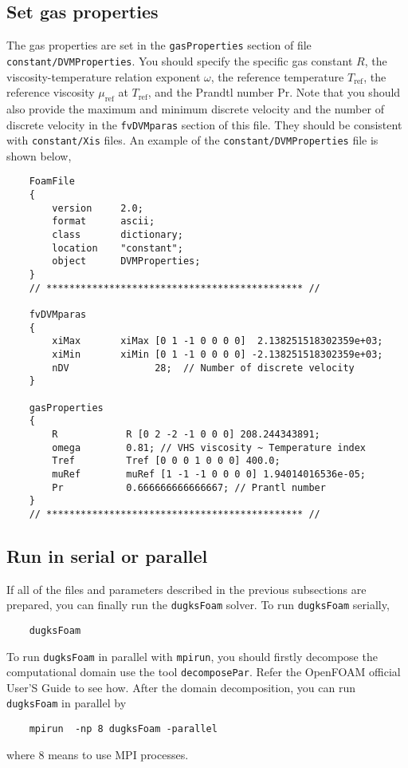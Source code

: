 \subsection{Set gas properties}
The gas properties are set in the \verb|gasProperties| section of file \verb|constant/DVMProperties|.
You should specify the specific gas constant $R$, the viscosity-temperature relation exponent $\omega$,
the reference temperature $T_\text{ref}$, the reference viscosity  $\mu_\text{ref}$ at $T_\text{ref}$,
and the Prandtl number Pr.
Note that you should also provide the maximum and minimum discrete velocity and the number of
discrete velocity in the \verb|fvDVMparas| section of this file.
They should be consistent with \verb|constant/Xis| files.
An example of the \verb|constant/DVMProperties| file is shown below,
\begin{verbatim}
    FoamFile
    {
        version     2.0;
        format      ascii;
        class       dictionary;
        location    "constant";
        object      DVMProperties;
    }
    // ********************************************* //

    fvDVMparas
    {
        xiMax       xiMax [0 1 -1 0 0 0 0]  2.138251518302359e+03;
        xiMin       xiMin [0 1 -1 0 0 0 0] -2.138251518302359e+03;
        nDV               28;  // Number of discrete velocity
    }

    gasProperties
    {
        R            R [0 2 -2 -1 0 0 0] 208.244343891;
        omega        0.81; // VHS viscosity ~ Temperature index
        Tref         Tref [0 0 0 1 0 0 0] 400.0;
        muRef        muRef [1 -1 -1 0 0 0 0] 1.94014016536e-05;
        Pr           0.666666666666667; // Prantl number
    }
    // ********************************************* //
\end{verbatim}

\subsection{Run in serial or parallel}
If all of the files and parameters described in the previous subsections are prepared, you can finally run the \verb|dugksFoam| solver.
To run \verb|dugksFoam| serially,
\begin{verbatim}
    dugksFoam
\end{verbatim}
To run \verb|dugksFoam| in parallel with \verb|mpirun|, you should firstly decompose the computational domain use the tool \verb|decomposePar|.
Refer the OpenFOAM official User'S Guide to see how.
After the domain decomposition, you can run \verb|dugksFoam| in parallel by
\begin{verbatim}
    mpirun  -np 8 dugksFoam -parallel
\end{verbatim}
where 8 means to use MPI processes.

